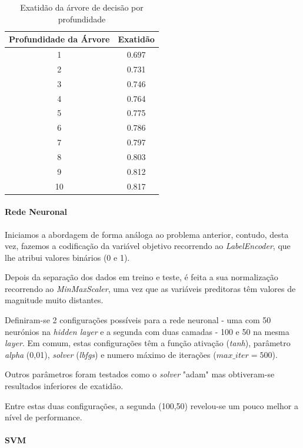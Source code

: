 \documentclass[conference]{IEEEtran}
\begin{document}
\begin{table}[ht]
	\centering
	\caption{Exatidão da árvore de decisão por profundidade}
	\begin{tabular}{|c|c|}
		\hline
		\textbf{Profundidade da Árvore} & \textbf{Exatidão} \\
		\hline
		1  & 0.697 \\
		2  & 0.731 \\
		3  & 0.746 \\
		4  & 0.764 \\
		5  & 0.775 \\
		6  & 0.786 \\
		7  & 0.797 \\
		8  & 0.803 \\
		9  & 0.812 \\
		10 & 0.817 \\
		\hline
	\end{tabular}
	\label{tab:acc_tree_depth}
\end{table}

\medskip

\paragraph{Rede Neuronal}

Iniciamos a abordagem de forma análoga ao problema anterior, contudo, desta vez, fazemos a codificação da variável objetivo recorrendo ao \textit{LabelEncoder}, que lhe atribui valores binários (0 e 1).

Depois da separação dos dados em treino e teste, é feita a sua normalização recorrendo ao \textit{MinMaxScaler}, uma vez que as variáveis preditoras têm valores de magnitude muito distantes.

Definiram-se 2 configurações possíveis para a rede neuronal - uma com 50 neurónios na \textit{hidden layer} e a segunda com duas camadas - 100 e 50 na mesma \textit{layer}. Em comum, estas configurações têm a função ativação (\textit{tanh}), parâmetro \textit{alpha} (0,01), \textit{solver} (\textit{lbfgs}) e numero máximo de iterações ($max\_iter = 500$).

Outros parâmetros foram testados como o \textit{solver} "adam" mas obtiveram-se resultados inferiores de exatidão.

Entre estas duas configurações, a segunda (100,50) revelou-se um pouco melhor a nível de performance. 

\medskip

\paragraph{SVM}
\end{document}
